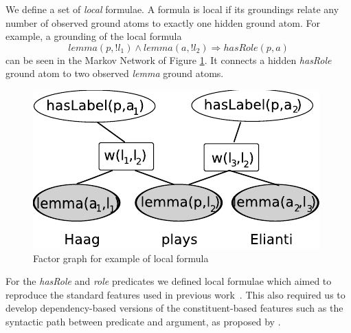 


We define a set of \emph{local} formulae. A formula is local if its groundings relate any number of observed ground atoms to exactly one hidden ground atom. For example, a grounding of the local formula 
\[lemma(p,!l_1) \wedge lemma(a,!l_2) \Rightarrow hasRole(p,a)\]
can be seen in the Markov Network of Figure \ref{fig:local2}. It connects a hidden \emph{hasRole} ground atom to two observed \emph{lemma} ground atoms.


\begin{figure}
\begin{center}
    \includegraphics[scale=.80]{LocalFormula2}
\end{center}
\caption{Factor graph for example of local formula}
\label{fig:local2}
\end{figure}

For the \emph{hasRole} and \emph{role} predicates we defined local formulae which aimed to reproduce the standard features used in previous work~\citep{xue04calibrating}. This also required us to develop dependency-based versions of the constituent-based features such as the syntactic path between predicate and argument, as proposed by \cite{xue04calibrating}. 

